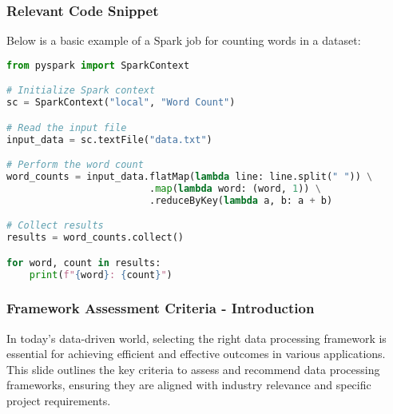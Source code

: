 \documentclass[aspectratio=169]{beamer}
\begin{document}
\begin{frame}[fragile]
    \frametitle{Relevant Code Snippet}
    Below is a basic example of a Spark job for counting words in a dataset:
    \begin{lstlisting}[language=Python]
from pyspark import SparkContext

# Initialize Spark context
sc = SparkContext("local", "Word Count")

# Read the input file
input_data = sc.textFile("data.txt")

# Perform the word count
word_counts = input_data.flatMap(lambda line: line.split(" ")) \
                         .map(lambda word: (word, 1)) \
                         .reduceByKey(lambda a, b: a + b)

# Collect results
results = word_counts.collect()

for word, count in results:
    print(f"{word}: {count}")
    \end{lstlisting}
\end{frame}

\begin{frame}[fragile]
    \frametitle{Framework Assessment Criteria - Introduction}
    In today's data-driven world, selecting the right data processing framework is essential for achieving efficient and effective outcomes in various applications. This slide outlines the key criteria to assess and recommend data processing frameworks, ensuring they are aligned with industry relevance and specific project requirements.
\end{frame}
\end{document}
